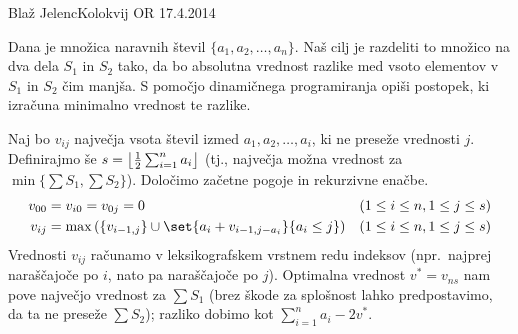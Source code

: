 \begin{naloga}{Blaž Jelenc}{Kolokvij OR 17.4.2014}
\begin{vprasanje}
Dana je množica naravnih števil $\{a_1, a_2, \dots, a_n\}$.
Naš cilj je razdeliti to množico na dva dela $S_1$ in $S_2$ tako,
da bo absolutna vrednost razlike
med vsoto elementov v $S_1$ in $S_2$ čim manjša.
S pomočjo dinamičnega programiranja opiši postopek,
ki izračuna minimalno vrednost te razlike.
\end{vprasanje}

\begin{odgovor}
Naj bo $v_{ij}$ največja vsota števil izmed $a_1, a_2, \dots, a_i$,
ki ne preseže vrednosti $j$.
Definirajmo še $s = \left\lfloor {1 \over 2} \sum_{i=1}^n a_i \right\rfloor$
(tj., največja možna vrednost za $\min\{\sum S_1, \sum S_2\}$).
Določimo začetne pogoje in rekurzivne enačbe.
\begin{align*}
v_{00} &= v_{i0} = v_{0j} = 0 && (1 \le i \le n, 1 \le j \le s) \\
v_{ij} &= \max\left(\{v_{i-1, j}\}
                    \cup \set{a_i + v_{i-1, j-a_i}}{a_i \le j}\right)
&& (1 \le i \le n, 1 \le j \le s)
\end{align*}
Vrednosti $v_{ij}$ računamo v leksikografskem vrstnem redu indeksov
(npr.~najprej naraščajoče po $i$, nato pa naraščajoče po $j$).
Optimalna vrednost $v^* = v_{ns}$ nam pove največjo vrednost za $\sum S_1$
(brez škode za splošnost lahko predpostavimo, da ta ne preseže $\sum S_2$);
razliko dobimo kot $\sum_{i=1}^n a_i - 2v^*$.
\end{odgovor}
\end{naloga}
